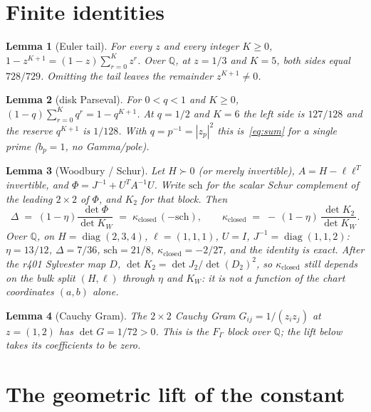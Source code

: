 \documentclass[11pt]{article}
\newtheorem{lemma}{Lemma}
\theoremstyle{remark}
\begin{document}
\section{Finite identities}\label{sec:satz}

\begin{lemma}[Euler tail]\label{lem:tail}
For every $z$ and every integer $K\ge 0$,
$1-z^{K+1}=(1-z)\sum_{r=0}^K z^r$.
Over $\mathbb{Q}$, at $z=1/3$ and $K=5$, both sides equal
$728/729$.
Omitting the tail leaves the remainder $z^{K+1}\neq 0$.
\end{lemma}

\begin{lemma}[disk Parseval]\label{lem:disk}
For $0<q<1$ and $K\ge 0$,
$(1-q)\sum_{r=0}^K q^r=1-q^{K+1}$.
At $q=1/2$ and $K=6$ the left side is $127/128$ and the
reserve $q^{K+1}$ is $1/128$.
With $q=p^{-1}=|z_p|^2$ this is~\eqref{eq:sum} for a single
prime ($b_p=1$, no Gamma/pole).
\end{lemma}

\begin{lemma}[Woodbury / Schur]\label{lem:kappa}
Let $H\succ 0$ (or merely invertible), $A=H-\ell\ell^T$
invertible, and $\Phi=J^{-1}+U^T A^{-1}U$.
Write $\mathrm{sch}$ for the scalar Schur complement of the
leading $2\times 2$ of $\Phi$, and $K_2$ for that block.
Then
\[
\Delta
\;=\;
(1-\eta)\frac{\det\Phi}{\det K_W}
\;=\;
\kappa_{\mathrm{closed}}\,(-\mathrm{sch}),
\qquad
\kappa_{\mathrm{closed}}
\;=\;
-\,(1-\eta)\,\frac{\det K_2}{\det K_W}.
\]
Over $\mathbb{Q}$, on $H=\operatorname{diag}(2,3,4)$,
$\ell=(1,1,1)$, $U=I$, $J^{-1}=\operatorname{diag}(1,1,2)$:
$\eta=13/12$, $\Delta=7/36$, $\mathrm{sch}=21/8$,
$\kappa_{\mathrm{closed}}=-2/27$, and the identity is exact.
After the r401 Sylvester map $D$, $\det K_2=\det J_2/\det(D_2)^2$,
so $\kappa_{\mathrm{closed}}$ still depends on the bulk split
$(H,\ell)$ through $\eta$ and $K_W$: it is not a function of
the chart coordinates $(a,b)$ alone.
\end{lemma}

\begin{lemma}[Cauchy Gram]\label{lem:cauchy}
The $2\times 2$ Cauchy Gram $G_{ij}=1/(z_i z_j)$ at
$z=(1,2)$ has $\det G=1/72>0$.
This is the $F_\Gamma$ block over $\mathbb{Q}$; the lift below
takes its coefficients to be zero.
\end{lemma}

\section{The geometric lift of the constant}\label{sec:E1}
\end{document}
